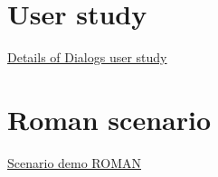 \documentclass[twoside,a4paper,10pt]{report}
\newcommand{\dokutitleleveltwo}[1]{\chapter{#1}}
\begin{document}
\dokutitleleveltwo{User study}
\label{8e39c880b382a46f3aac08dd30b0e029}%

\hyperref[bec5cbe6da06ffa747e41a290292d554]{Details of Dialogs user study}


\dokutitleleveltwo{Roman scenario}
\label{951c0dd2747b87c0096d4db85432a384}%

\hyperref[2d269a2773f7ccddb56cd5741a52babe]{Scenario demo ROMAN}
\end{document}
